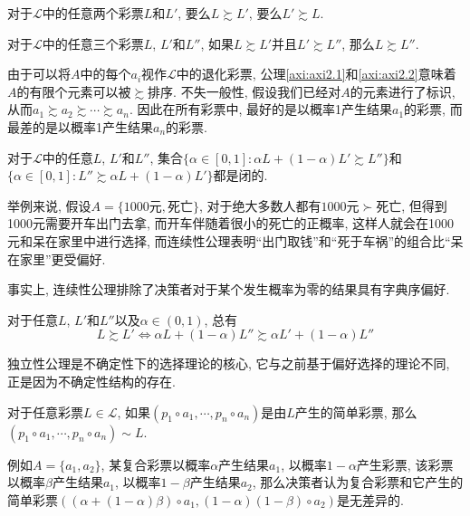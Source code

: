 \documentclass[cn, 12pt, math=mtpro2, bibstyle=apa, blue]{elegantbook}
\begin{document}
\begin{axiom}[完备性]\label{axi:axi2.1}
对于$\mathscr{L}$中的任意两个彩票$L$和$L'$, 要么$L\succsim L'$, 要么$L'\succsim L$.
\end{axiom}

\begin{axiom}[传递性]\label{axi:axi2.2}
对于$\mathscr{L}$中的任意三个彩票$L$, $L'$和$L''$, 如果$L\succsim L'$并且$L'\succsim L''$, 那么$L\succsim L''$.
\end{axiom}

由于可以将$A$中的每个$a_i$视作$\mathscr{L}$中的退化彩票, 公理\ref{axi:axi2.1}和\ref{axi:axi2.2}意味着$A$的有限个元素可以被$
\succsim$排序. 不失一般性, 假设我们已经对$A$的元素进行了标识, 从而$a_1\succsim a_2\succsim\cdots\succsim a_n$. 因此在所有彩票中, 最好的是以概率1产生结果$a_1$的彩票, 而最差的是以概率1产生结果$a_n$的彩票.

\begin{axiom}[连续性]\label{axi:axi2.3}
对于$\mathscr{L}$中的任意$L$, $L'$和$L''$, 集合$\{\alpha\in[0,1]:\alpha L+(1-\alpha)L'\succsim L''\}$和$\{\alpha\in[0,1]:L''\succsim \alpha L+(1-\alpha)L'\}$都是闭的.
\end{axiom}
举例来说, 假设$A=\{1000\text{元},\text{死亡}\}$, 对于绝大多数人都有$1000\text{元}\succ\text{死亡}$, 但得到1000元需要开车出门去拿, 而开车伴随着很小的死亡的正概率, 这样人就会在1000元和呆在家里中进行选择, 而连续性公理表明“出门取钱”和“死于车祸”的组合比“呆在家里”更受偏好.

事实上, 连续性公理排除了决策者对于某个发生概率为零的结果具有字典序偏好.

\begin{axiom}[独立性]\label{axi:axi2.4}
对于任意$L$, $L'$和$L''$以及$\alpha\in(0,1)$, 总有
$$L\succsim L'\Longleftrightarrow \alpha L+(1-\alpha)L''\succsim \alpha L'+(1-\alpha)L''$$
\end{axiom}
独立性公理是不确定性下的选择理论的核心, 它与之前基于偏好选择的理论不同, 正是因为不确定性结构的存在.

\begin{proposition}[复合彩票的简化]\label{pro:pro2.1}
对于任意彩票$L\in\mathscr{L}$, 如果$(p_1\circ a_1,\cdots,p_n\circ a_n)$是由$L$产生的简单彩票, 那么$(p_1\circ a_1,\cdots,p_n\circ a_n)\sim L$.
\end{proposition}
例如$A=\{a_1,a_2\}$, 某复合彩票以概率$\alpha$产生结果$a_1$, 以概率$1-\alpha$产生彩票, 该彩票以概率$\beta$产生结果$a_1$, 以概率$1-\beta$产生结果$a_2$, 那么决策者认为复合彩票和它产生的简单彩票$((\alpha+(1-\alpha)\beta)\circ a_1, (1-\alpha)(1-\beta)\circ a_2)$是无差异的.
\end{document}

